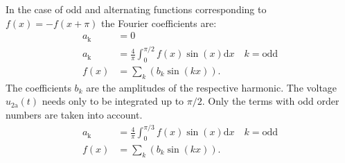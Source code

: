 \begin{solutionblock}
    In the case of odd and alternating functions corresponding to $f(x)=-f(x+\pi)$ the Fourier coefficients are:
    \begin{equation}
        \begin{split}
        a_\mathrm{k} &= 0 \\
        a_\mathrm{k} &= \frac{4}{\pi} \int_0^{\pi/2} f(x)\sin(x) \mathrm{d}x \quad k=\mathrm{odd} \\
        f(x) &= \sum_{k}^{} \left( b_k \sin(kx) \right).
        \end{split}
    \end{equation}
    The coefficients $b_k$ are the amplitudes of the respective harmonic. The voltage $u_{\mathrm{2a}}(t)$ needs 
    only to be integrated up to $\pi/2$. Only the terms with odd order numbers are taken into account.
    \begin{equation}
        \begin{split}
        a_\mathrm{k} &= \frac{4}{\pi} \int_0^{\pi/3} f(x)\sin(x) \mathrm{d}x \quad k=\mathrm{odd} \\
        f(x) &= \sum_{k}^{} \left( b_k \sin(kx) \right).
        \end{split}
    \end{equation}



       
    
    
        
\end{solutionblock}

\begin{solutionblock}
\end{solutionblock}
